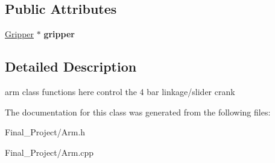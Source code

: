\subsection*{Public Attributes}
\begin{DoxyCompactItemize}
\item 
\hypertarget{classArm_a5d8c0e5790de4c4cf4399314afbbf03a}{\hyperlink{classGripper}{Gripper} $\ast$ {\bfseries gripper}}\label{classArm_a5d8c0e5790de4c4cf4399314afbbf03a}

\end{DoxyCompactItemize}


\subsection{Detailed Description}
arm class functions here control the 4 bar linkage/slider crank 

The documentation for this class was generated from the following files\-:\begin{DoxyCompactItemize}
\item 
Final\-\_\-\-Project/Arm.\-h\item 
Final\-\_\-\-Project/Arm.\-cpp\end{DoxyCompactItemize}
